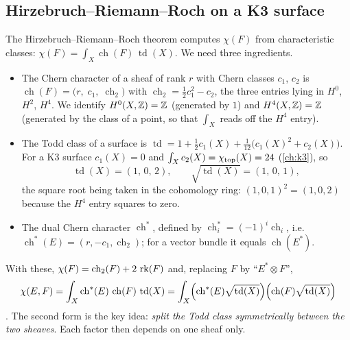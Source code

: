 \subsection{Hirzebruch--Riemann--Roch on a K3 surface}
The Hirzebruch--Riemann--Roch theorem computes $\chi(F)$ from characteristic classes:
$\chi(F)=\int_X \operatorname{ch}(F)\,\operatorname{td}(X)$. We need three ingredients.
\begin{itemize}[leftmargin=*]
\item The Chern character of a sheaf of rank $r$ with Chern classes
  $c_1$, $c_2$ is
  $\operatorname{ch}(F)=\bigl(r,\;c_1,\;\operatorname{ch}_2\bigr)$ with
  $\operatorname{ch}_2=\tfrac12c_1^2-c_2$, the three entries lying in $H^0$, $H^2$, $H^4$. We
  identify $H^0(X,\mathbb{Z})=\mathbb{Z}$ (generated by $1$) and $H^4(X,\mathbb{Z})=\mathbb{Z}$ (generated by the class of a
  point, so that $\int_X$ reads off the $H^4$ entry).
\item The Todd class of a surface is $\operatorname{td}=1+\tfrac12c_1(X)+\tfrac1{12}\bigl(c_1(X)^2
  +c_2(X)\bigr)$. For a K3 surface $c_1(X)=0$ and $\int_Xc_2(X)=\chi_{\rm top}(X)=24$
  (\cref{ch:k3}), so
  \begin{equation}\label{eq:mukai:todd}
    \operatorname{td}(X)=(1,\,0,\,2),\qquad \sqrt{\operatorname{td}(X)}=(1,\,0,\,1),
  \end{equation}
  the square root being taken in the cohomology ring: $(1,0,1)^2=(1,0,2)$ because the
  $H^4$ entry squares to zero.
\item The dual Chern character $\operatorname{ch}^*$, defined by
  $\operatorname{ch}^*_i=(-1)^i\operatorname{ch}_i$, i.e.\
  $\operatorname{ch}^*(E)=(r,-c_1,\operatorname{ch}_2)$; for a vector bundle it equals
  $\operatorname{ch}(E^*)$.
\end{itemize}
With these, $\chi(F)=\operatorname{ch}_2(F)+2\,\operatorname{rk}(F)$ and, replacing $F$ by ``$E^*\otimes F$'',
\begin{equation}\label{eq:mukai:hrr}
  \chi(E,F)=\int_X\operatorname{ch}^*(E)\,\operatorname{ch}(F)\,\operatorname{td}(X)
  =\int_X\Bigl(\operatorname{ch}^*(E)\sqrt{\operatorname{td}(X)}\Bigr)
          \Bigl(\operatorname{ch}(F)\sqrt{\operatorname{td}(X)}\Bigr)
\end{equation}
. The second form is the key idea:
\emph{split the Todd class symmetrically between the two sheaves}. Each factor then depends on
one sheaf only.

